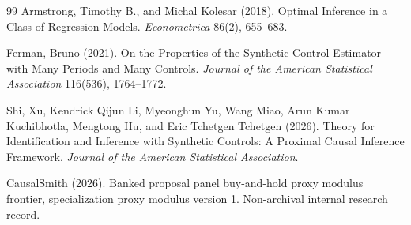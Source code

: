 \documentclass{article}
\begin{document}
\begin{thebibliography}{99}
   Armstrong, Timothy B., and Michal Kolesar (2018). Optimal Inference in a Class of Regression Models. \emph{Econometrica} 86(2), 655--683.

   Ferman, Bruno (2021). On the Properties of the Synthetic Control Estimator with Many Periods and Many Controls. \emph{Journal of the American Statistical Association} 116(536), 1764--1772.

   Shi, Xu, Kendrick Qijun Li, Myeonghun Yu, Wang Miao, Arun Kumar Kuchibhotla, Mengtong Hu, and Eric Tchetgen Tchetgen (2026). Theory for Identification and Inference with Synthetic Controls: A Proximal Causal Inference Framework. \emph{Journal of the American Statistical Association}.

   CausalSmith (2026). Banked proposal panel buy-and-hold proxy modulus frontier, specialization proxy modulus version 1. Non-archival internal research record.

\end{thebibliography}
\end{document}
